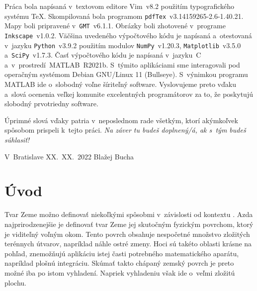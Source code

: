 \documentclass[a4paper, 12pt]{book}
\begin{document}
Práca bola napísaná v~textovom editore Vim~v8.2 použitím typografického systému
\TeX.  Skompilovaná bola programom \texttt{pdfTex}~v3.14159265-2.6-1.40.21.
Mapy boli pripravené v~\texttt{GMT}~v6.1.1.  Obrázky boli zhotovené v~programe
\texttt{Inkscape}~v1.0.2.  Väčšina uvedeného výpočtového kódu je napísaná
a~otestovaná v~jazyku \texttt{Python}~v3.9.2 použitím modulov
\texttt{NumPy}~v1.20.3, \texttt{Matplotlib}~v3.5.0 a~\texttt{SciPy}~v1.7.3.
Časť výpočtového kódu je napísaná v~jazyku~C a~v~prostredí~MATLAB~R2021b.
S~týmito aplikáciami sme interagovali pod operačným systémom Debian GNU/Linux
11 (Bullseye).  S~výnimkou programu MATLAB ide o~slobodný voľne šíriteľný
software.  Vyslovujeme preto vďaku a~slová ocenenia veľkej komunite
excelentných programátorov za to, že poskytujú slobodný prvotriedny software.

Úprimné slová vďaky patria v~neposlednom rade všetkým, ktorí akýmkoľvek
spôsobom prispeli k~tejto práci. \emph{Na záver tu budeš doplnený/á, ak s~tým
budeš súhlasiť!}


\vspace{4ex}

\noindent V~Bratislave XX.~XX.~2022 \hfill Blažej Bucha






\tableofcontents
\newpage







\chapter{Úvod}

Tvar Zeme možno definovať niekoľkými spôsobmi v~závislosti od kontextu 
\citep{MoritzTheFigureOfTheEarth}.  Azda najprirodzenejšie je definovať tvar 
Zeme jej skutočným fyzickým povrchom, ktorý je viditeľný voľným okom.  Tento 
povrch obsahuje nespočetné množstvo zložitých terénnych útvarov, napríklad 
náhle ostré zmeny.  Hoci sú takéto oblasti krásne na pohľad, znemožňujú 
aplikáciu istej časti potrebného matematického aparátu, napríklad plošnú 
integráciu.  Skúmať takto chápaný zemský povrch je preto možné iba po istom 
vyhladení.  Napriek vyhladeniu však ide o~veľmi zložitú plochu.
\end{document}

